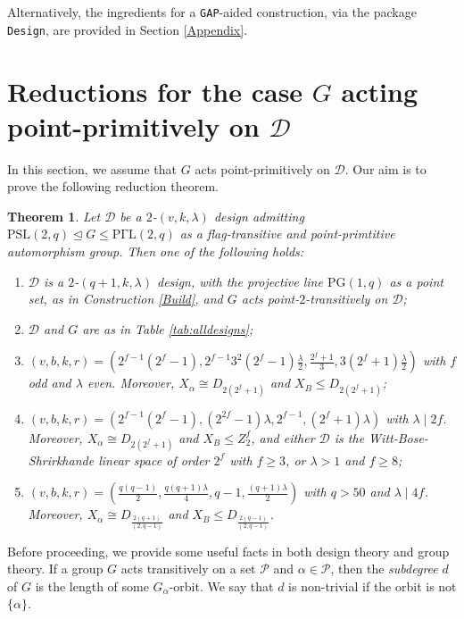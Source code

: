 \documentclass[a4paper,twopage,reqno,12pt]{amsart}
\newtheorem{theorem}{Theorem}[section]
\theoremstyle{definition}
\numberwithin{equation}{section}
\newcommand{\PSL}{\mathrm{PSL}}
\newcommand{\PGaL}{\mathrm{P\Gamma L}}
\newcommand{\PG}{\mathrm{PG}}
\renewcommand{\leq}{\leqslant}
\renewcommand{\geq}{\geqslant}
\begin{document}
Alternatively, the ingredients for a \texttt{GAP}-aided construction, via the package \texttt{Design}, are provided in Section \ref{Appendix}.

\section{Reductions for the case $G$ acting point-primitively on $\mathcal{D}$}\label{FT-PP-Section}
In this section, we assume that $G$ acts point-primitively on $\mathcal{D}$. Our aim is to prove the following reduction theorem.

\bigskip
\begin{theorem}\label{FT-PP-reduction}
Let $\mathcal{D}$ be a $2$-$(v,k,\lambda)$ design admitting $\PSL(2,q) \unlhd G\leq \PGaL(2,q)$ as a flag-transitive and point-primtitive automorphism group. Then one of the following holds:
\begin{enumerate}
    \item $\mathcal{D}$ is a $2$-$(q+1,k,\lambda)$ design, with the projective line $\PG(1,q)$ as a point set, as in Construction \ref{Build}, and $G$ acts point-$2$-transitively on $\mathcal{D}$; 
    \item $\mathcal{D}$ and $G$ are as in Table \ref{tab:alldesigns};
    \item $\left(v,b,k,r\right)=\left(2^{f-1}(2^{f}-1),2^{f-1}3^{2}(2^{f}-1)\frac{\lambda }{2},\frac{2^{f}+1}{3},3(2^{f}+1)\frac{\lambda }{2}\right)$ with $f$ odd and $\lambda$ even. Moreover, $X_{\alpha}\cong D_{2(2^f+1)}$ and $X_{B}\leq D_{2(2^f+1)}$; 
    \item$\left(v,b,k,r\right)=\left(2^{f-1}(2^{f}-1),(2^{2f}-1)\lambda,2^{f-1},(2^{f}+1)\lambda\right)$ with $\lambda \mid 2f$. Moreover, $X_{\alpha}\cong D_{2(2^f+1)}$ and $X_{B}\leq Z^{f}_{2}$, and either $\mathcal{D}$ is the Witt-Bose-Shrirkhande linear space of order $2^{f}$ with $f\geq 3$, or $\lambda>1$ and $f \geq 8$;
    \item $\left(v,b,k,r\right)=\left(\frac{q(q-1)}{2},\frac{q(q+1)\lambda}{4},q-1,\frac{(q+1)\lambda}{2}\right)$ with $q>50$ and $\lambda \mid 4f$. Moreover, $X_{\alpha}\cong D_{\frac{2(q+1)}{(2,q-1)}}$ and $X_{B}\leq D_{\frac{2(q-1)}{(2,q-1)}}$.
\end{enumerate}
\end{theorem}

Before proceeding, we provide some useful facts in both design theory and group theory.
If a group $G$ acts transitively on a set $\mathcal{P}$ and $\alpha\in \mathcal{P}$, then the
\emph{subdegree} $d$ of $G$ is the length of some $G_\alpha$-orbit.  We say that $d$ is non-trivial if the orbit is not $\{\alpha\}$. 
\end{document}
